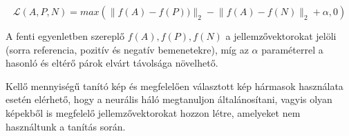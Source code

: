 

\[ \mathcal{L}(A,P,N) = max \left( \lVert f(A) - f(P)) \rVert_2 - \lVert f(A) - f(N) \rVert_2 + \alpha, 0 \right) \]

A fenti egyenletben szereplő $f(A), f(P), f(N)$ a jellemzővektorokat jelöli (sorra referencia, pozitív és negatív bemenetekre), míg az $\alpha$ paraméterrel a hasonló és eltérő párok elvárt  távolsága növelhető. 


Kellő mennyiségű tanító kép és megfelelően választott kép hármasok használata esetén elérhető, hogy a neurális háló megtanuljon általánosítani, vagyis olyan képekből is megfelelő jellemzővektorokat hozzon létre, amelyeket nem használtunk a tanítás során. 


